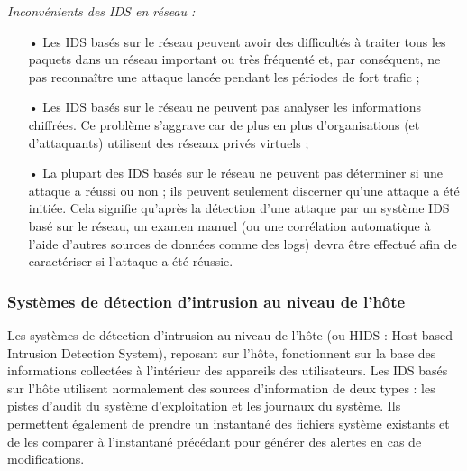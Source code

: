 \vspace{1em}

\textit{Inconvénients des IDS en réseau :}\\

\begin{itemize}[itemsep=1em]
    \item[•] Les IDS basés sur le réseau peuvent avoir des difficultés à traiter tous les paquets dans un réseau important ou très fréquenté et, par conséquent, ne pas reconnaître une attaque lancée pendant les périodes de fort trafic ;
    \item[•] Les IDS basés sur le réseau ne peuvent pas analyser les informations chiffrées. Ce problème s'aggrave car de plus en plus d'organisations (et d'attaquants) utilisent des réseaux privés virtuels ;
    \newpage
    \item[•] La plupart des IDS basés sur le réseau ne peuvent pas déterminer si une attaque a réussi ou non ; ils peuvent seulement discerner qu'une attaque a été initiée. Cela signifie qu'après la détection d'une attaque par un système IDS basé sur le réseau, un examen manuel (ou une corrélation automatique à l'aide d'autres sources de données comme des logs) devra être effectué afin de caractériser si l'attaque a été réussie.
\end{itemize}

\vspace{1em}

\subsubsection{Systèmes de détection d'intrusion au niveau de l'hôte}

\vspace{0.5em}

Les systèmes de détection d'intrusion au niveau de l'hôte (ou HIDS : Host-based Intrusion Detection System), reposant sur l'hôte, fonctionnent sur la base des informations collectées à l'intérieur des appareils des utilisateurs. Les IDS basés sur l'hôte utilisent normalement des sources d'information de deux types : les pistes d'audit du système d'exploitation et les journaux du système. Ils permettent également de prendre un instantané des fichiers système existants et de les comparer à l'instantané précédant pour générer des alertes en cas de modifications.\\

\vspace{1em}

